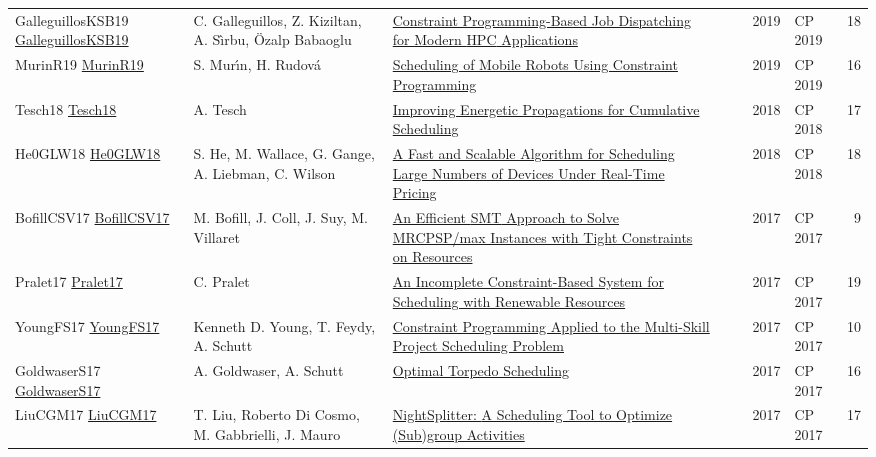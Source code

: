 {\begin{longtable}{p{3cm}p{6cm}p{7cm}rrrp{3cm}r}
GalleguillosKSB19 \href{https://doi.org/10.1007/978-3-030-30048-7\_26}{GalleguillosKSB19} & C. Galleguillos, Z. Kiziltan, A. S{\^{\i}}rbu, {\"{O}}zalp Babaoglu & \href{papers/GalleguillosKSB19.pdf}{Constraint Programming-Based Job Dispatching for Modern {HPC} Applications} &  & \cite{GalleguillosKSB19} & 2019 & CP 2019 & 18\\
MurinR19 \href{https://doi.org/10.1007/978-3-030-30048-7\_27}{MurinR19} & S. Mur{\'{\i}}n, H. Rudov{\'{a}} & \href{papers/MurinR19.pdf}{Scheduling of Mobile Robots Using Constraint Programming} &  & \cite{MurinR19} & 2019 & CP 2019 & 16\\
Tesch18 \href{https://doi.org/10.1007/978-3-319-98334-9\_41}{Tesch18} & A. Tesch & \href{papers/Tesch18.pdf}{Improving Energetic Propagations for Cumulative Scheduling} &  & \cite{Tesch18} & 2018 & CP 2018 & 17\\
He0GLW18 \href{https://doi.org/10.1007/978-3-319-98334-9\_42}{He0GLW18} & S. He, M. Wallace, G. Gange, A. Liebman, C. Wilson & \href{papers/He0GLW18.pdf}{A Fast and Scalable Algorithm for Scheduling Large Numbers of Devices Under Real-Time Pricing} &  & \cite{He0GLW18} & 2018 & CP 2018 & 18\\
BofillCSV17 \href{https://doi.org/10.1007/978-3-319-66158-2\_5}{BofillCSV17} & M. Bofill, J. Coll, J. Suy, M. Villaret & \href{papers/BofillCSV17.pdf}{An Efficient {SMT} Approach to Solve MRCPSP/max Instances with Tight Constraints on Resources} &  & \cite{BofillCSV17} & 2017 & CP 2017 & 9\\
Pralet17 \href{https://doi.org/10.1007/978-3-319-66158-2\_16}{Pralet17} & C. Pralet & \href{papers/Pralet17.pdf}{An Incomplete Constraint-Based System for Scheduling with Renewable Resources} &  & \cite{Pralet17} & 2017 & CP 2017 & 19\\
YoungFS17 \href{https://doi.org/10.1007/978-3-319-66158-2\_20}{YoungFS17} & Kenneth D. Young, T. Feydy, A. Schutt & \href{papers/YoungFS17.pdf}{Constraint Programming Applied to the Multi-Skill Project Scheduling Problem} &  & \cite{YoungFS17} & 2017 & CP 2017 & 10\\
GoldwaserS17 \href{https://doi.org/10.1007/978-3-319-66158-2\_22}{GoldwaserS17} & A. Goldwaser, A. Schutt & \href{papers/GoldwaserS17.pdf}{Optimal Torpedo Scheduling} &  & \cite{GoldwaserS17} & 2017 & CP 2017 & 16\\
LiuCGM17 \href{https://doi.org/10.1007/978-3-319-66158-2\_24}{LiuCGM17} & T. Liu, Roberto Di Cosmo, M. Gabbrielli, J. Mauro & \href{papers/LiuCGM17.pdf}{NightSplitter: {A} Scheduling Tool to Optimize (Sub)group Activities} &  & \cite{LiuCGM17} & 2017 & CP 2017 & 17\\

\end{longtable}}
